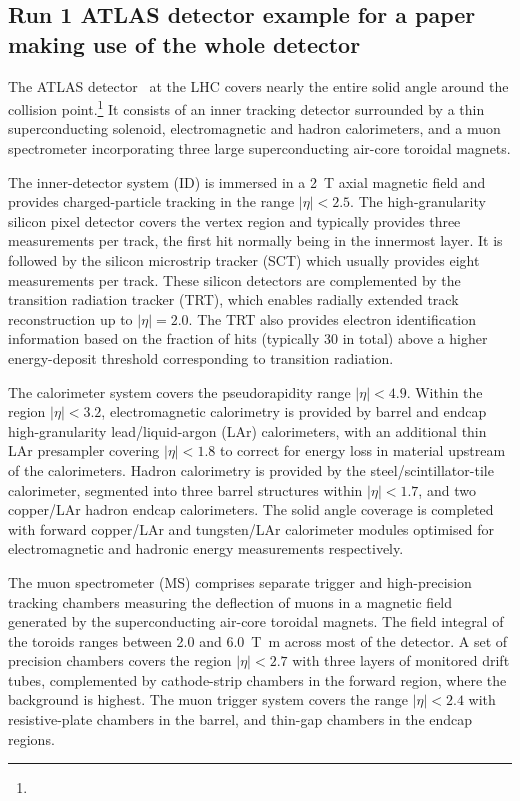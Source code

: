 \subsection{Run 1 ATLAS detector example for a paper making use of the whole detector}
\label{sec:atlas1b}

The ATLAS detector~\cite{PERF-2007-01} at the LHC covers nearly the entire solid angle around the collision point.\footnote{\AtlasCoordFootnote}
It consists of an inner tracking detector surrounded by a thin superconducting solenoid, electromagnetic and hadron calorimeters,
and a muon spectrometer incorporating three large superconducting air-core toroidal magnets.

The inner-detector system (ID) is immersed in a \SI{2}{\tesla} axial magnetic field 
and provides charged-particle tracking in the range \(|\eta| < 2.5\).
The high-granularity silicon pixel detector covers the vertex region and typically provides three measurements per track, 
the first hit normally being in the innermost layer.
It is followed by the silicon microstrip tracker (SCT) which usually provides eight measurements per track.
These silicon detectors are complemented by the transition radiation tracker (TRT),
which enables radially extended track reconstruction up to \(|\eta| = 2.0\). 
The TRT also provides electron identification information 
based on the fraction of hits (typically 30 in total) above a higher energy-deposit threshold corresponding to transition radiation.

The calorimeter system covers the pseudorapidity range \(|\eta| < 4.9\).
Within the region \(|\eta|< 3.2\), electromagnetic calorimetry is provided by barrel and 
endcap high-granularity lead/liquid-argon (LAr) calorimeters,
with an additional thin LAr presampler covering \(|\eta| < 1.8\)
to correct for energy loss in material upstream of the calorimeters.
Hadron calorimetry is provided by the steel/scintillator-tile calorimeter,
segmented into three barrel structures within \(|\eta| < 1.7\), and two copper/LAr hadron endcap calorimeters.
The solid angle coverage is completed with forward copper/LAr and tungsten/LAr calorimeter modules
optimised for electromagnetic and hadronic energy measurements respectively.

The muon spectrometer (MS) comprises separate trigger and
high-precision tracking chambers measuring the deflection of muons in a magnetic field generated by the superconducting air-core toroidal magnets.
The field integral of the toroids ranges between \num{2.0} and \SI{6.0}{\tesla\metre}
across most of the detector. 
A set of precision chambers covers the region \(|\eta| < 2.7\) with three layers of monitored drift tubes,
complemented by cathode-strip chambers in the forward region, where the background is highest.
The muon trigger system covers the range \(|\eta| < 2.4\) with resistive-plate chambers in the barrel, and thin-gap chambers in the endcap regions.

